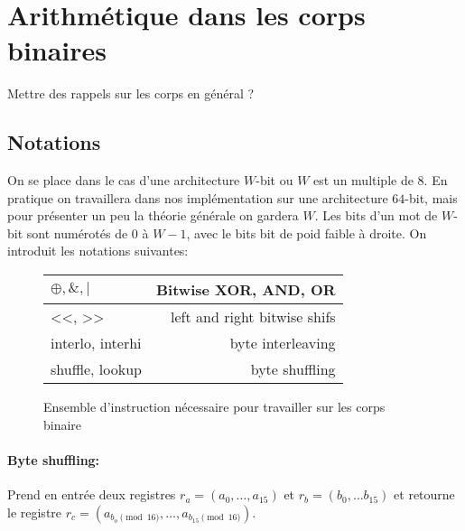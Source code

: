 \documentclass[12pt]{article}
\begin{document}
\section{Arithmétique dans les corps binaires}
Mettre des rappels sur les corps en général ?
\subsection{Notations}
On se place dans le cas d'une architecture $W$-bit ou $W$ est un multiple de $8$. En pratique on travaillera dans nos implémentation sur une architecture $64$-bit, mais pour présenter un peu la théorie générale on gardera $W$. Les bits d'un mot de $W$- bit sont numérotés de $0$ à $W-1$, avec le bits bit de poid faible à droite. On introduit les notations suivantes:

\vspace{1cm}
\begin{figure}[h!]
    \centering
\begin{tabular}{|l|r|}
  \hline
  $\oplus, \&, |$ & Bitwise XOR, AND, OR \\
  \hline
  <<, >> & left and right bitwise shifs\\
  \hline
  interlo, interhi & byte interleaving \\
  \hline
  shuffle, lookup & byte shuffling \\
  \hline
\end{tabular}
    \caption{Ensemble d'instruction nécessaire pour travailler sur les corps binaire}
    \label{fig:set of instructions}
\end{figure}


\paragraph{Byte shuffling:} Prend en entrée deux registres $r_a = (a_0, \ldots, a_{15})$ et $r_b=(b_0, \ldots b_{15})$ et retourne le registre $r_c=(a_{b_o \pmod{16}}, \ldots, a_{b_{15} \pmod{16}})$.
\end{document}
